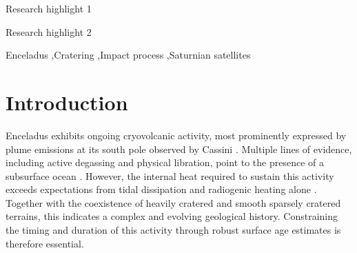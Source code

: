 \documentclass[preprint,11pt,3p,times,authoryear]{elsarticle}
\begin{document}
\begin{frontmatter}
\begin{highlights}
\item Research highlight 1
\item Research highlight 2
\end{highlights}

\begin{keyword}
Enceladus \sep Cratering \sep Impact process \sep Saturnian satellites


\end{keyword}

\end{frontmatter}


\linenumbers
\section{Introduction}
\label{intro}

Enceladus exhibits ongoing cryovolcanic activity, most prominently expressed by plume emissions at its south pole observed by Cassini \citep{Porco2004,Spencer2006}. Multiple lines of evidence, including active degassing and physical libration, point to the presence of a subsurface ocean \citep{Thomas2016,Nimmo2023}. However, the internal heat required to sustain this activity exceeds expectations from tidal dissipation and radiogenic heating alone \citep{Meyer2007,Roberts2008}. Together with the coexistence of heavily cratered and smooth sparsely cratered terrains, this indicates a complex and evolving geological history. Constraining the timing and duration of this activity through robust surface age estimates is therefore essential.\\
\end{document}
